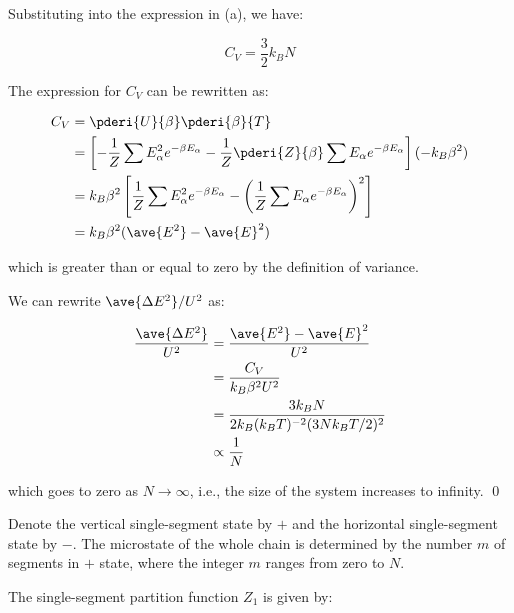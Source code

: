 \documentclass[12pt]{article}
\begin{document}
Substituting into the expression in (a), we have:

\begin{equation}
    C_{V} = \frac{3}{2} k_{B} N
\end{equation}

The expression for $C_{V}$ can be rewritten as:

\begin{equation}
    \begin{split}
        C_{V} &= \pderi{U}{\beta} \pderi{\beta}{T} \\
        &= \left[ -\frac{1}{Z} \sum E_{\alpha}^{2} e^{-\beta E_{\alpha}} - \frac{1}{Z} \pderi{Z}{\beta} \sum E_{\alpha} e^{-\beta E_{\alpha}} \right] (-k_{B} \beta^{2}) \\
        &= k_{B} \beta^{2} \left[ \frac{1}{Z} \sum E_{\alpha}^{2} e^{-\beta E_{\alpha}} - \left( \frac{1}{Z} \sum E_{\alpha} e^{-\beta E_{\alpha}} \right)^{2} \right] \\
        &= k_{B} \beta^{2} (\ave{E^{2}} - \ave{E}^{2})
    \end{split}
\end{equation}

which is greater than or equal to zero by the definition of variance.

We can rewrite $\ave{\Delta E^{2}}/U^{2}$ as:

\begin{equation}
    \begin{split}
        \frac{\ave{\Delta E^{2}}}{U^{2}} &= \frac{\ave{E^{2}} - \ave{E}^{2}}{U^{2}} \\
        &= \frac{C_{V}}{k_{B} \beta^{2} U^{2}} \\
        &= \frac{3k_{B} N}{2k_{B} (k_{B}T)^{-2} (3Nk_{B}T/2)^{2}} \\
        &\propto \frac{1}{N}
    \end{split}
\end{equation}

which goes to zero as $N \rightarrow \infty$, i.e., the size of the system increases to infinity.
\qed



Denote the vertical single-segment state by $+$ and the horizontal single-segment state by $-$. The microstate of the whole chain is determined by the number $m$ of segments in $+$ state, where the integer $m$ ranges from zero to $N$.

The single-segment partition function $Z_{1}$ is given by:
\end{document}

